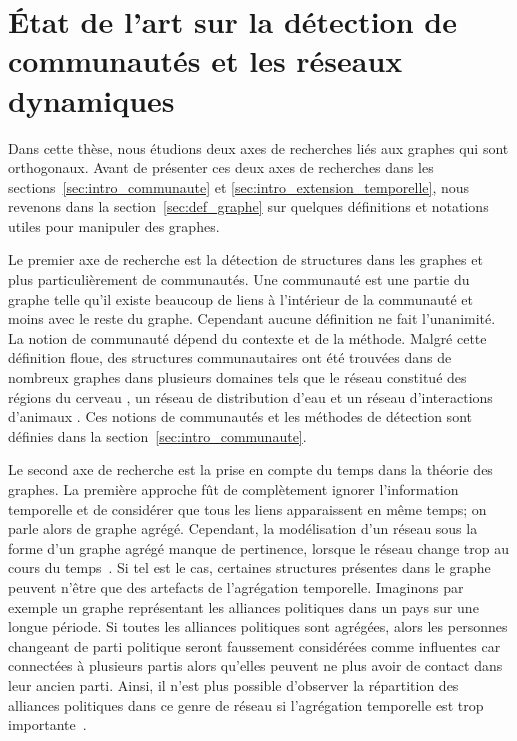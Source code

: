 
\chapter{État de l'art sur la détection de communautés et les réseaux dynamiques}
\minitoc
\label{chap:etat_art}
Dans cette thèse, nous étudions deux axes de recherches liés aux graphes qui sont orthogonaux.
Avant de présenter ces deux axes de recherches dans les sections~\ref{sec:intro_communaute} et \ref{sec:intro_extension_temporelle}, nous revenons dans la section~\ref{sec:def_graphe} sur quelques définitions et notations utiles pour manipuler des graphes.

Le premier axe de recherche est la détection de structures dans les graphes et plus particulièrement de communautés.
Une communauté est une partie du graphe telle qu'il existe beaucoup de liens à l'intérieur de la communauté et moins avec le reste du graphe.
Cependant aucune définition ne fait l'unanimité.
La notion de communauté dépend du contexte et de la méthode.
Malgré cette définition floue, des structures communautaires ont été trouvées dans de nombreux graphes dans plusieurs domaines tels que le réseau constitué des régions du cerveau \cite{DeReus2014}, un réseau de distribution d'eau \cite{DiNardo2015} et un réseau d'interactions d'animaux \cite{Farine2015}.
Ces notions de communautés et les méthodes de détection sont définies dans la section~\ref{sec:intro_communaute}.

Le second axe de recherche est la prise en compte du temps dans la théorie des graphes.
La première approche fût de complètement ignorer l'information temporelle et de considérer que tous les liens apparaissent en même temps; on parle alors de graphe agrégé.
Cependant, la modélisation d'un réseau sous la forme d'un graphe agrégé manque de pertinence, lorsque le réseau change trop au cours du temps~\cite{Holme2015b}.
Si tel est le cas, certaines structures présentes dans le graphe peuvent n'être que des artefacts de l'agrégation temporelle.
Imaginons par exemple un graphe représentant les alliances politiques dans un pays sur une longue période.
Si toutes les alliances politiques sont agrégées, alors les personnes changeant de parti politique seront faussement considérées comme influentes car connectées à plusieurs partis alors qu'elles peuvent ne plus avoir de contact dans leur ancien parti.
Ainsi, il n'est plus possible d'observer la répartition des alliances politiques dans ce genre de réseau si l'agrégation temporelle est trop importante~\cite{Mucha2010}.

